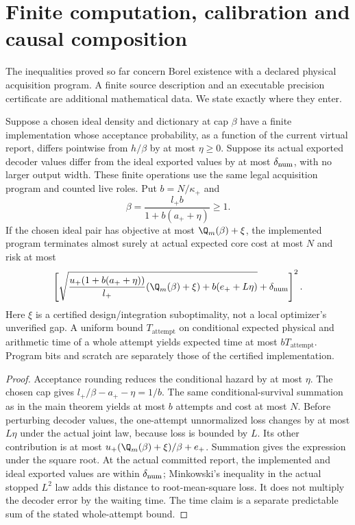 \section{Finite computation, calibration and causal composition}\label{sec:composition}
The inequalities proved so far concern Borel existence with a declared physical acquisition program. A finite source description and an executable precision certificate are additional mathematical data. We state exactly where they enter.

\begin{proposition}\label{prop:numerics}
Suppose a chosen ideal density and dictionary at cap $\beta$ have a finite implementation whose acceptance probability, as a function of the current virtual report, differs pointwise from $h/\beta$ by at most $\eta\ge0$. Suppose its actual exported decoder values differ from the ideal exported values by at most $\delta_{\rm num}$, with no larger output width. These finite operations use the same legal acquisition program and counted live roles. Put $b=N/\kappa_+$ and
\[
 \beta=\frac{l_+b}{1+b(a_++\eta)}\ge1.
\]
If the chosen ideal pair has objective at most $\Q_m(\beta)+\xi$, the implemented program terminates almost surely at actual expected core cost at most $N$ and risk at most
\begin{equation}\label{eq:numerical-law}
 \left[
 \sqrt{\frac{u_+(1+b(a_++\eta))}{l_+}
                  (\Q_m(\beta)+\xi)+b(e_++L\eta)}
       +\delta_{\rm num}\right]^2.
\end{equation}
Here $\xi$ is a certified design/integration suboptimality, not a local optimizer's unverified gap. A uniform bound $T_{\mathrm{attempt}}$ on conditional expected physical and arithmetic time of a whole attempt yields expected time at most $bT_{\mathrm{attempt}}$. Program bits and scratch are separately those of the certified implementation.
\end{proposition}
\begin{proof}
Acceptance rounding reduces the conditional hazard by at most $\eta$. The chosen cap gives $l_+/\beta-a_+-\eta=1/b$. The same conditional-survival summation as in the main theorem yields at most $b$ attempts and cost at most $N$. Before perturbing decoder values, the one-attempt unnormalized loss changes by at most $L\eta$ under the actual joint law, because loss is bounded by $L$. Its other contribution is at most $u_+(\Q_m(\beta)+\xi)/\beta+e_+$. Summation gives the expression under the square root. At the actual committed report, the implemented and ideal exported values are within $\delta_{\rm num}$; Minkowski's inequality in the actual stopped $L^2$ law adds this distance to root-mean-square loss. It does not multiply the decoder error by the waiting time. The time claim is a separate predictable sum of the stated whole-attempt bound.
\end{proof}

